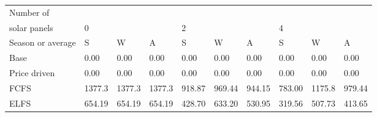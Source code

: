 \begin{table}[h] 
\centering 
\begin{tabular}{l|lll|lll|lll}Number of \\ solar panels&0& & &2& & &4& & \\ \hline 
Season or average & S & W & A & S & W & A & S & W & A \\ \hline 
Base&0.00&0.00&0.00&0.00&0.00&0.00&0.00&0.00&0.00 \\ 
Price driven&0.00&0.00&0.00&0.00&0.00&0.00&0.00&0.00&0.00 \\ 
FCFS&1377.3&1377.3&1377.3&918.87&969.44&944.15&783.00&1175.8&979.44 \\ 
ELFS&654.19&654.19&654.19&428.70&633.20&530.95&319.56&507.73&413.65 \\ 
\end{tabular} 
\end{table}